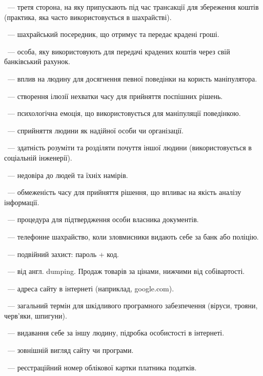 ~--- третя сторона, на яку припускають під час трансакції для збереження коштів (практика, яка часто використовується в шахрайстві).

~--- шахрайський посередник, що отримує та передає крадені гроші.

~--- особа, яку використовують для передачі крадених коштів через свій банківський рахунок.

~--- вплив на людину для досягнення певної поведінки на користь маніпулятора.

~--- створення ілюзії нехватки часу для прийняття поспішних рішень.

~--- психологічна емоція, що використовується для маніпуляції поведінкою.

~--- сприйняття людини як надійної особи чи організації.

~--- здатність розуміти та розділяти почуття іншої людини (використовується в соціальній інженерії).

~--- недовіра до людей та їхніх намірів.

\newpage

~--- обмеженість часу для прийняття рішення, що впливає на якість аналізу інформації.

~--- процедура для підтвердження особи власника документів.

~--- телефонне шахрайство, коли зловмисники видають себе за банк або поліцію.

~--- подвійний захист: пароль + код.

~--- від англ. dumping. Продаж товарів за цінами, нижчими від собівартості.

~--- адреса сайту в інтернеті (наприклад, google.com).

~--- загальний термін для шкідливого програмного забезпечення (віруси, трояни, черв'яки, шпигуни).

~--- видавання себе за іншу людину, підробка особистості в інтернеті.

~--- зовнішній вигляд сайту чи програми.

~--- реєстраційний номер облікової картки платника податків.

